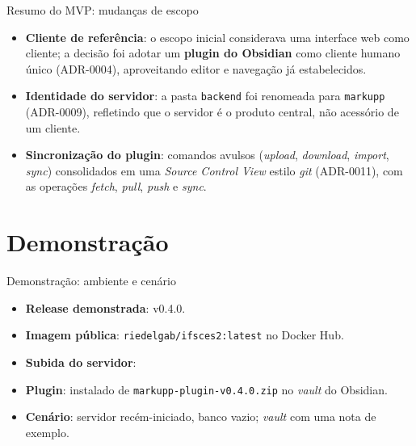 \documentclass[aspectratio=169]{beamer}
\begin{document}
\begin{frame}{Resumo do MVP: mudanças de escopo}
    \begin{itemize}
        \item \textbf{Cliente de referência}: o escopo inicial considerava uma interface web como cliente; a decisão foi adotar um \textbf{plugin do Obsidian} como cliente humano único (ADR-0004), aproveitando editor e navegação já estabelecidos.
        \item \textbf{Identidade do servidor}: a pasta \texttt{backend} foi renomeada para \texttt{markupp} (ADR-0009), refletindo que o servidor é o produto central, não acessório de um cliente.
        \item \textbf{Sincronização do plugin}: comandos avulsos (\textit{upload}, \textit{download}, \textit{import}, \textit{sync}) consolidados em uma \emph{Source Control View} estilo \textit{git} (ADR-0011), com as operações \textit{fetch}, \textit{pull}, \textit{push} e \textit{sync}.
    \end{itemize}
\end{frame}

\section{Demonstração}

\begin{frame}{Demonstração: ambiente e cenário}
    \begin{itemize}
        \item \textbf{Release demonstrada}: v0.4.0.
        \item \textbf{Imagem pública}: \texttt{riedelgab/ifsces2:latest} no Docker Hub.
        \item \textbf{Subida do servidor}: \\
        \item \textbf{Plugin}: instalado de \texttt{markupp-plugin-v0.4.0.zip} no \emph{vault} do Obsidian.
        \item \textbf{Cenário}: servidor recém-iniciado, banco vazio; \emph{vault} com uma nota de exemplo.
    \end{itemize}
\end{frame}
\end{document}
